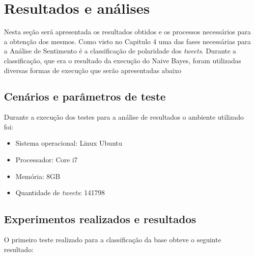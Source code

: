 \chapter{Resultados e análises}\label{cap:resultados}

Nesta seção será apresentada os resultados obtidos e os processos necessários para a obtenção dos mesmos. Como visto no Capitulo 4 uma das fases necessárias para a Análise de Sentimento é a classificação de polaridade dos \textit{tweets}. Durante a classificação, que era o resultado da execução do Naive Bayes, foram utilizadas diversas formas de execução que serão apresentadas abaixo

\section{Cenários e parâmetros de teste}\label{sec:cenarios}
Durante a execução dos testes para a análise de resultados o ambiente utilizado foi:
\begin{itemize}
	\item Sistema operacional: Linux Ubuntu
	\item Processador: Core i7
	\item Memória: 8GB
	\item Quantidade de \textit{tweets}: 141798
\end{itemize}


\section{Experimentos realizados e resultados}\label{sec:resultados}
O primeiro teste realizado para a classificação da base obteve o seguinte resultado:
\begin{table}[]
	\caption{1º teste}
	\label{teste-1}
\end{table}

